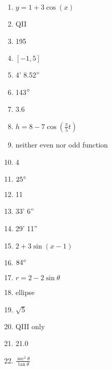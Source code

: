\documentclass[../uilmath.tex]{subfiles}
\begin{document}
\begin{enumerate}[label=\bfseries\arabic*.]
    \item %
    $y=1+3\cos(x)$

    \item %
    QII 

    \item %
    195

    \item %
    $[-1,5]$

    \item %
    4' 8.52''

    \item %
    143$\degree$

    \item %
    3.6

    \item %
    $h=8-7\cos\left(\frac{\pi}{5}t\right)$

    \item %
    neither even nor odd function 

    \item %
    4

    \item %
    $25\degree$

    \item %
    11

    \item %
    33' 6'' 

    \item %
    29' 11''

    \item %
    $2+3\sin(x-1)$

    \item %
    $84\degree$

    \item %
    $r=2-2\sin\theta$

    \item %
    ellipse 

    \item %
    $\sqrt{5}$

    \item %
    QIII only 

    \item %
    21.0

    \item %
    $\frac{\sec^2\theta}{\tan\theta}$


\end{enumerate}
\end{document}

